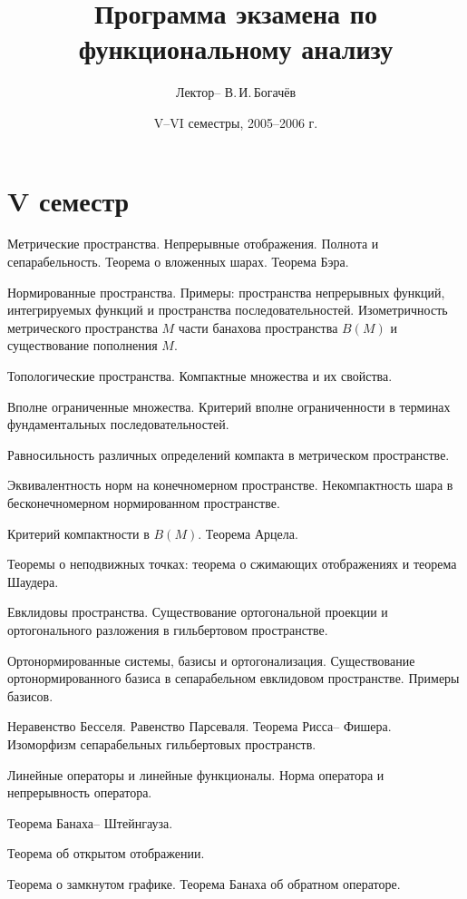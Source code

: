 \documentclass[a4paper]{article}
\title{Программа экзамена по функциональному анализу}
\author{Лектор-- В.\,И.\,Богачёв}
\date{V--VI семестры, 2005--2006 г.}
\begin{document}
\maketitle

\section*{V семестр}

\begin{nums}{-2}
\item Метрические пространства. Непрерывные отображения. Полнота и сепарабельность. Теорема о вложенных шарах. Теорема Бэра.
\item Нормированные пространства. Примеры: пространства непрерывных функций, интегрируемых функций и пространства
      последовательностей. Изометричность метрического пространства $M$ части банахова пространства $B(M)$ и существование пополнения $M$.
\item Топологические пространства. Компактные множества и их свойства.
\item Вполне ограниченные множества. Критерий вполне ограниченности в терминах фундаментальных последовательностей.
\item Равносильность различных определений компакта в метрическом пространстве.
\item Эквивалентность норм на конечномерном пространстве. Некомпактность шара в бесконечномерном нормированном пространстве.
\item Критерий компактности в $B(M)$. Теорема Арцела.
\item Теоремы о неподвижных точках: теорема о сжимающих отображениях и теорема Шаудера.
\item Евклидовы пространства. Существование ортогональной проекции и ортогонального разложения в гильбертовом пространстве.
\item Ортонормированные системы, базисы и ортогонализация. Существование ортонормированного базиса в сепарабельном евклидовом
      пространстве. Примеры базисов.
\item Неравенство Бесселя. Равенство Парсеваля. Теорема Рисса-- Фишера. Изоморфизм сепарабельных гильбертовых пространств.
\item Линейные операторы и линейные функционалы. Норма оператора и непрерывность оператора.
\item Теорема Банаха-- Штейнгауза.
\item Теорема об открытом отображении.
\item Теорема о замкнутом графике. Теорема Банаха об обратном операторе.

\end{nums}
\end{document}
